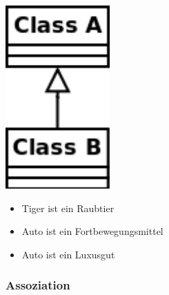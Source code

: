 \documentclass[11pt, a4paper]{article}
\begin{document}
\begin{minipage}[h]{0.3\textwidth}
    \raggedleft \includegraphics[width=0.3\textwidth]{Klassen-Elemente/1.png} 
\end{minipage}
\begin{minipage}[h]{0.65\textwidth}
    \begin{itemize}
        \item Tiger ist ein Raubtier
        \item Auto ist ein Fortbewegungsmittel
        \item Auto ist ein Luxusgut
    \end{itemize}
\end{minipage}

\vspace{1em}

\raggedright \subsubsection{Assoziation}

\vspace{1em}
\end{document}
